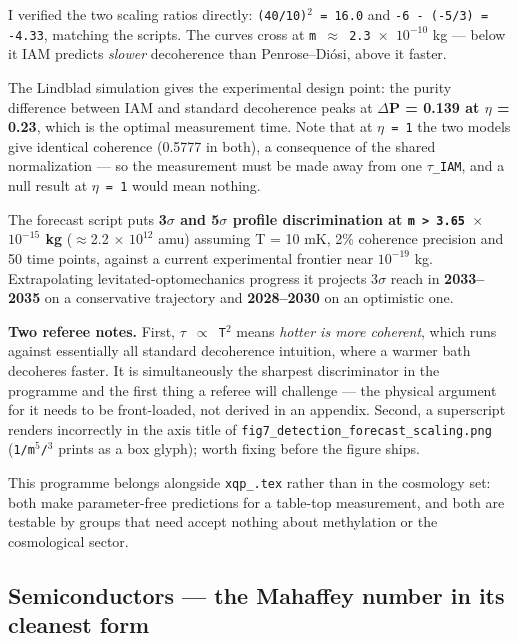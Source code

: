 \documentclass[12pt,a4paper]{article}
\begin{document}
I verified the two scaling ratios directly: \texttt{(40/10)$^{2}$ = 16.0} and \texttt{-6 - (-5/3) = -4.33}, matching the scripts. The curves cross at \texttt{m $\approx$ 2.3 $\times$ $10^{-10}$} kg --- below it IAM predicts \textit{slower} decoherence than Penrose--Di\'osi, above it faster.


The Lindblad simulation gives the experimental design point: the purity difference between IAM and standard decoherence peaks at \textbf{$\Delta$P = 0.139 at $\eta$ = 0.23}, which is the optimal measurement time. Note that at \texttt{$\eta$ = 1} the two models give identical coherence (0.5777 in both), a consequence of the shared normalization --- so the measurement must be made away from one \texttt{$\tau$\_IAM}, and a null result at \texttt{$\eta$ = 1} would mean nothing.


The forecast script puts \textbf{3$\sigma$ and 5$\sigma$ profile discrimination at \texttt{m > 3.65 $\times$ $10^{-15}$} kg} ($\approx$2.2 $\times$ $10^{12}$ amu) assuming T = 10 mK, 2\% coherence precision and 50 time points, against a current experimental frontier near $10^{-19}$ kg. Extrapolating levitated-optomechanics progress it projects 3$\sigma$ reach in \textbf{2033--2035} on a conservative trajectory and \textbf{2028--2030} on an optimistic one.


\textbf{Two referee notes.} First, \texttt{$\tau$ $\propto$ T$^{2}$} means \textit{hotter is more coherent}, which runs against essentially all standard decoherence intuition, where a warmer bath decoheres faster. It is simultaneously the sharpest discriminator in the programme and the first thing a referee will challenge --- the physical argument for it needs to be front-loaded, not derived in an appendix. Second, a superscript renders incorrectly in the axis title of \texttt{fig7\_detection\_forecast\_scaling.png} (\texttt{1/m$^{5}$/$^{3}$} prints as a box glyph); worth fixing before the figure ships.


This programme belongs alongside \texttt{xqp\_.tex} rather than in the cosmology set: both make parameter-free predictions for a table-top measurement, and both are testable by groups that need accept nothing about methylation or the cosmological sector.



\subsection{Semiconductors --- the Mahaffey number in its cleanest form}
\end{document}
